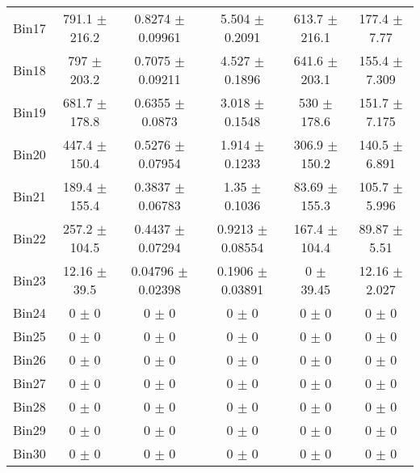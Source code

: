 \begin{tabular}{@{\extracolsep{4pt}}lccccc@{}}
     Bin17 & 791.1 $\pm$ 216.2 & 0.8274 $\pm$ 0.09961 & 5.504 $\pm$ 0.2091 & 613.7 $\pm$ 216.1 & 177.4 $\pm$ 7.77 \\ 
     Bin18 & 797 $\pm$ 203.2 & 0.7075 $\pm$ 0.09211 & 4.527 $\pm$ 0.1896 & 641.6 $\pm$ 203.1 & 155.4 $\pm$ 7.309 \\ 
     Bin19 & 681.7 $\pm$ 178.8 & 0.6355 $\pm$ 0.0873 & 3.018 $\pm$ 0.1548 & 530 $\pm$ 178.6 & 151.7 $\pm$ 7.175 \\ 
     Bin20 & 447.4 $\pm$ 150.4 & 0.5276 $\pm$ 0.07954 & 1.914 $\pm$ 0.1233 & 306.9 $\pm$ 150.2 & 140.5 $\pm$ 6.891 \\ 
     Bin21 & 189.4 $\pm$ 155.4 & 0.3837 $\pm$ 0.06783 & 1.35 $\pm$ 0.1036 & 83.69 $\pm$ 155.3 & 105.7 $\pm$ 5.996 \\ 
     Bin22 & 257.2 $\pm$ 104.5 & 0.4437 $\pm$ 0.07294 & 0.9213 $\pm$ 0.08554 & 167.4 $\pm$ 104.4 & 89.87 $\pm$ 5.51 \\ 
     Bin23 & 12.16 $\pm$ 39.5 & 0.04796 $\pm$ 0.02398 & 0.1906 $\pm$ 0.03891 & 0 $\pm$ 39.45 & 12.16 $\pm$ 2.027 \\ 
     Bin24 & 0 $\pm$ 0 & 0 $\pm$ 0 & 0 $\pm$ 0 & 0 $\pm$ 0 & 0 $\pm$ 0 \\ 
     Bin25 & 0 $\pm$ 0 & 0 $\pm$ 0 & 0 $\pm$ 0 & 0 $\pm$ 0 & 0 $\pm$ 0 \\ 
     Bin26 & 0 $\pm$ 0 & 0 $\pm$ 0 & 0 $\pm$ 0 & 0 $\pm$ 0 & 0 $\pm$ 0 \\ 
     Bin27 & 0 $\pm$ 0 & 0 $\pm$ 0 & 0 $\pm$ 0 & 0 $\pm$ 0 & 0 $\pm$ 0 \\ 
     Bin28 & 0 $\pm$ 0 & 0 $\pm$ 0 & 0 $\pm$ 0 & 0 $\pm$ 0 & 0 $\pm$ 0 \\ 
     Bin29 & 0 $\pm$ 0 & 0 $\pm$ 0 & 0 $\pm$ 0 & 0 $\pm$ 0 & 0 $\pm$ 0 \\ 
     Bin30 & 0 $\pm$ 0 & 0 $\pm$ 0 & 0 $\pm$ 0 & 0 $\pm$ 0 & 0 $\pm$ 0 \\ 
\hline\hline
  \end{tabular}
